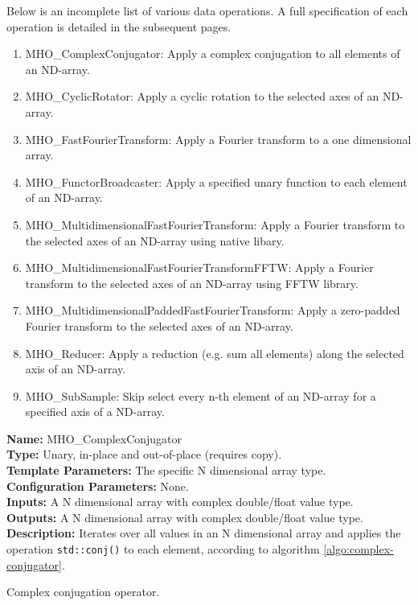 Below is an incomplete list of various data operations. A full specification of each operation is detailed in the subsequent pages.
\begin{enumerate}
 \item MHO\_ComplexConjugator: Apply a complex conjugation to all elements of an ND-array.
 \item MHO\_CyclicRotator: Apply a cyclic rotation to the selected axes of an ND-array.
 \item MHO\_FastFourierTransform: Apply a Fourier transform to a one dimensional array.
 \item MHO\_FunctorBroadcaster: Apply a specified unary function to each element of an ND-array.
 \item MHO\_MultidimensionalFastFourierTransform: Apply a Fourier transform to the selected axes of an ND-array using native libary.
 \item MHO\_MultidimensionalFastFourierTransformFFTW: Apply a Fourier transform to the selected axes of an ND-array using FFTW library.
 \item MHO\_MultidimensionalPaddedFastFourierTransform: Apply a zero-padded Fourier transform to the selected axes of an ND-array.
 \item MHO\_Reducer: Apply a reduction (e.g. sum all elements) along the selected axis of an ND-array.
 \item MHO\_SubSample: Skip select every n-th element of an ND-array for a specified axis of a ND-array.
\end{enumerate}

\newpage

\noindent \textbf{Name:} MHO\_ComplexConjugator \\
\textbf{Type:} Unary, in-place and out-of-place (requires copy). \\
\textbf{Template Parameters:} The specific N dimensional array type.\\
\textbf{Configuration Parameters:} None.\\
\textbf{Inputs:} A N dimensional array with complex double/float value type. \\
\textbf{Outputs:} A N dimensional array with complex double/float value type. \\
\textbf{Description:} Iterates over all values in an N dimensional array and applies the operation \texttt{std::conj()} to each element, according to algorithm \ref{algo:complex-conjugator}. \\


\begin{algorithm}[h!]
  \caption{Complex conjugation operator.}
    \begin{algorithmic}[1]
    \end{algorithmic}
  \label{algo:complex-conjugator}
\end{algorithm}



